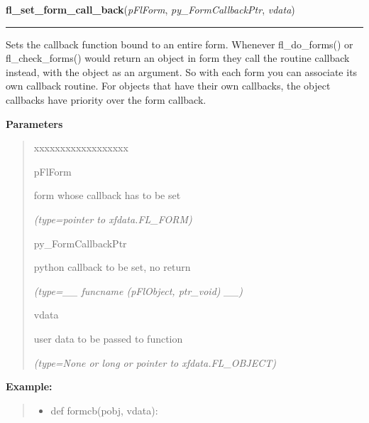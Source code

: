 \hspace{.8\funcindent}\begin{boxedminipage}{\funcwidth}

    \raggedright \textbf{fl\_set\_form\_call\_back}(\textit{pFlForm}, \textit{py\_FormCallbackPtr}, \textit{vdata})

    \vspace{-1.5ex}

    \rule{\textwidth}{0.5\fboxrule}
\setlength{\parskip}{2ex}
    Sets the callback function bound to an entire form. Whenever 
    fl\_do\_forms() or fl\_check\_forms() would return an object in form 
    they call the routine callback instead, with the object as an argument.
    So with each form you can associate its own callback routine. For 
    objects that have their own callbacks, the object callbacks have 
    priority over the form callback.

\setlength{\parskip}{1ex}
      \textbf{Parameters}
      \vspace{-1ex}

      \begin{quote}
        \begin{Ventry}{xxxxxxxxxxxxxxxxxx}

          \item[pFlForm]

          form whose callback has to be set

            {\it (type=pointer to xfdata.FL\_FORM)}

          \item[py\_FormCallbackPtr]

          python callback to be set, no return

            {\it (type=\_\_ funcname (pFlObject, ptr\_void) \_\_)}

          \item[vdata]

          user data to be passed to function

            {\it (type=None or long or pointer to xfdata.FL\_OBJECT)}

        \end{Ventry}

      \end{quote}

\textbf{Example:}
\begin{quote}
  \begin{itemize}

  \item
    \setlength{\parskip}{0.6ex}
def formcb(pobj, vdata):




\end{itemize}
\end{quote}
\end{boxedminipage}
